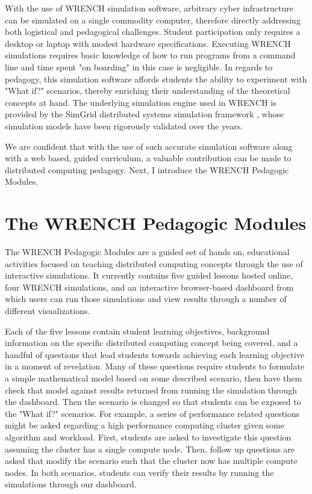 \documentclass{article}
\begin{document}
With the use of WRENCH simulation software, arbitrary cyber infrastructure can be simulated
on a single commodity computer, therefore directly addressing both logistical and 
pedagogical challenges. Student participation only requires a desktop or laptop with modest
hardware specifications. Executing WRENCH simulations requires basic knowledge of how to
run programs from a command line and time spent "on boarding" in this case is
negligible. In regards to pedagogy, this simulation software affords students the ability
to experiment with "What if?" scenarios, thereby enriching their understanding of the
theoretical concepts at hand. The underlying simulation engine used in WRENCH is provided
by the SimGrid distributed systems simulation framework \cite{simgrid}, whose simulation models have been 
rigorously validated over the years. 

We are confident that with the use of such accurate simulation
software along with a web based, guided curriculum, a valuable contribution can be made to
distributed computing pedagogy. Next, I introduce the WRENCH Pedagogic Modules.


\section{The WRENCH Pedagogic Modules}
The WRENCH Pedagogic Modules are a guided set of hands on, educational activities focused
on teaching distributed computing concepts through the use of interactive simulations. It currently 
contains five guided lessons hosted online, four WRENCH simulations, and an interactive
browser-based dashboard from which users can run those simulations and view results through
a number of different visualizations. 

Each of the five lessons contain student learning objectives, background information on the specific
distributed computing concept being covered, and a handful of questions that lead students towards
achieving each learning objective in a moment of revelation. Many of these questions require students
to formulate a simple mathematical model based on some described scenario, then have them check that
model against results returned from running the simulation through the dashboard. Then the scenario
is changed so that students can be exposed to the "What if?" scenarios. For example, 
a series of performance related questions might be asked regarding a high performance computing
cluster given some algorithm and workload. First, students are asked to investigate this question
assuming the cluster has a single compute node. Then, follow up questions are asked that modify
the scenario such that the cluster now has multiple compute nodes. In both scenarios, students can
verify their results by running the simulations through our dashboard. 
\end{document}
